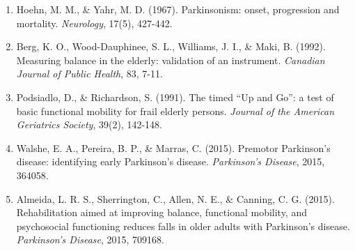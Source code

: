 \documentclass[12pt,a4paper,spanish,oneside]{book}
\begin{document}
\begin{enumerate}
  \item Hoehn, M. M., \& Yahr, M. D. (1967). Parkinsonism: onset, progression and mortality. \textit{Neurology}, 17(5), 427-442.
  
  \item Berg, K. O., Wood-Dauphinee, S. L., Williams, J. I., \& Maki, B. (1992). Measuring balance in the elderly: validation of an instrument. \textit{Canadian Journal of Public Health}, 83, 7-11.
  
  \item Podsiadlo, D., \& Richardson, S. (1991). The timed ``Up and Go'': a test of basic functional mobility for frail elderly persons. \textit{Journal of the American Geriatrics Society}, 39(2), 142-148.
  
  \item Walshe, E. A., Pereira, B. P., \& Marras, C. (2015). Premotor Parkinson's disease: identifying early Parkinson's disease. \textit{Parkinson's Disease}, 2015, 364058.
  
  \item Almeida, L. R. S., Sherrington, C., Allen, N. E., \& Canning, C. G. (2015). Rehabilitation aimed at improving balance, functional mobility, and psychosocial functioning reduces falls in older adults with Parkinson's disease. \textit{Parkinson's Disease}, 2015, 709168.
\end{enumerate}
\end{document}
